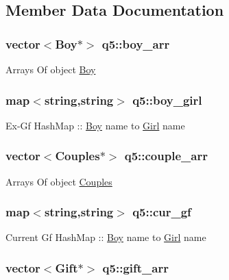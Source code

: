 \subsection{Member Data Documentation}
\hypertarget{classq5_ac6dae49ebe0f67c31142bc0505a2df02}{
\subsubsection[{boy\-\_\-arr}]{\setlength{\rightskip}{0pt plus 5cm}vector$<${\bf Boy}$\ast$$>$ q5\-::boy\-\_\-arr}}\label{classq5_ac6dae49ebe0f67c31142bc0505a2df02}
Arrays Of object \hyperlink{class_boy}{Boy} \hypertarget{classq5_a2e90a5b5dcf782ae8da7090498a0b2a9}{
\subsubsection[{boy\-\_\-girl}]{\setlength{\rightskip}{0pt plus 5cm}map$<$string,string$>$ q5\-::boy\-\_\-girl}}\label{classq5_a2e90a5b5dcf782ae8da7090498a0b2a9}
Ex-\/\-Gf Hash\-Map \-:\-: \hyperlink{class_boy}{Boy} name to \hyperlink{class_girl}{Girl} name \hypertarget{classq5_a671e012ee634944c3143cca7649ccbaf}{
\subsubsection[{couple\-\_\-arr}]{\setlength{\rightskip}{0pt plus 5cm}vector$<${\bf Couples}$\ast$$>$ q5\-::couple\-\_\-arr}}\label{classq5_a671e012ee634944c3143cca7649ccbaf}
Arrays Of object \hyperlink{class_couples}{Couples} \hypertarget{classq5_a21627c1f3579f872a7652cc173caac56}{
\subsubsection[{cur\-\_\-gf}]{\setlength{\rightskip}{0pt plus 5cm}map$<$string,string$>$ q5\-::cur\-\_\-gf}}\label{classq5_a21627c1f3579f872a7652cc173caac56}
Current Gf Hash\-Map \-:\-: \hyperlink{class_boy}{Boy} name to \hyperlink{class_girl}{Girl} name \hypertarget{classq5_aaf0944563e725ae4f2532c25d3036b79}{
\subsubsection[{gift\-\_\-arr}]{\setlength{\rightskip}{0pt plus 5cm}vector$<${\bf Gift}$\ast$$>$ q5\-::gift\-\_\-arr}}\label{classq5_aaf0944563e725ae4f2532c25d3036b79}
